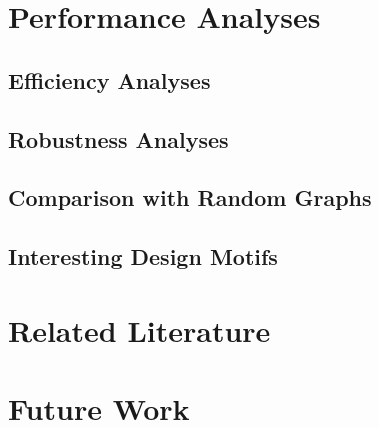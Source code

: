 \documentclass[a4paper,10pt]{article}
\begin{document}
\section{Performance Analyses}
\subsection{Efficiency Analyses}
\subsection{Robustness Analyses}
\subsection{Comparison with Random Graphs}
\subsection{Interesting Design Motifs}

\section{Related Literature}

\section{Future Work}
%
%
%
\end{document}
